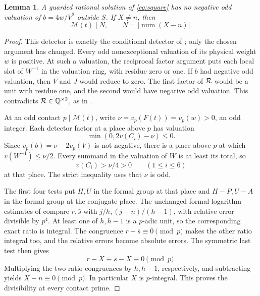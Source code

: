 \documentclass[11pt,a4paper]{article}
\newtheorem{lemma}[theorem]{Lemma}
\newcommand{\Q}{\mathbb Q}\newcommand{\Z}{\mathbb Z}
\begin{document}
\begin{lemma}\label{lem:local}
A guarded rational solution of \eqref{eq:square} has no negative odd
valuation of \(b=4w/V^2\) outside \(S\).
If \(X\ne n\), then
\[
 \mathcal M(t)\mid N,\qquad
 N=|\operatorname{num}(X-n)|.
\]
\end{lemma}
\begin{proof}
This detector is exactly the conditional detector of
\cite{Reweighted}; only the chosen argument has changed.
Every odd nonexceptional valuation of its physical weight \(w\)
is positive. At such a valuation, the reciprocal factor argument
puts each local slot of \(W^{-1}\) in the valuation ring, with residue
zero or one. If \(b\) had negative odd valuation, then \(V\) and \(J\)
would reduce to zero. The first factor of \({\cal R}\) would be a unit
with residue one, and the second would have negative odd valuation.
This contradicts \({\cal R}\in\Q^{\times2}\), as in \cite{Native}.

At an odd contact \(p\mid\mathcal M(t)\), write
\(\nu=v_p(F(t))=v_p(w)>0\), an odd integer. Each detector factor at
a place above \(p\) has valuation
\[
 \min(0,2v(C_i)-\nu)\le0.
\]
Since \(v_p(b)=\nu-2v_p(V)\) is not negative, there is a place above
\(p\) at which \(v(W^{-1})\le\nu/2\). Every summand in the valuation
of \(W\) is at least its total, so
\[
 v(C_i)>\nu/4>0\qquad(1\le i\le6)
\]
at that place. The strict inequality uses that \(\nu\) is odd.

The first four tests put \(H,U\) in the formal group at that place
and \(H-P,U-A\) in the formal group at the conjugate place.
The unchanged formal-logarithm estimates of \cite{Conditional}
compare \(r,\bar s\) with \(j/h,(j-n)/(h-1)\), with relative
error divisible by \(p^4\). At least one of \(h,h-1\) is a
\(p\)-adic unit, so the corresponding exact ratio is integral.
The congruence \(r-\bar s\equiv0\pmod p\) makes the other ratio
integral too, and the relative errors become absolute errors.
The symmetric last test then gives
\[
 r-X\equiv\bar s-X\equiv0\pmod p.
\]
Multiplying the two ratio congruences by \(h,h-1\), respectively,
and subtracting yields \(X-n\equiv0\pmod p\).
In particular \(X\) is \(p\)-integral. This proves the divisibility
at every contact prime.
\end{proof}
\end{document}
